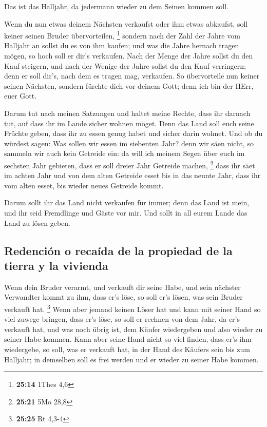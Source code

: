  Das ist das Halljahr, da jedermann wieder zu dem Seinen
kommen soll.

 Wenn du nun etwas deinem Nächsten verkaufst oder ihm
etwas abkaufst, soll keiner seinen Bruder übervorteilen, \footnote{\textbf{25:14}
  1Thes 4,6}  sondern nach der Zahl der Jahre vom
Halljahr an sollst du es von ihm kaufen; und was die Jahre hernach
tragen mögen, so hoch soll er dir's verkaufen.  Nach der
Menge der Jahre sollst du den Kauf steigern, und nach der Wenige der
Jahre sollst du den Kauf verringern; denn er soll dir's, nach dem es
tragen mag, verkaufen.  So übervorteile nun keiner seinen
Nächsten, sondern fürchte dich vor deinem Gott; denn ich bin der HErr,
euer Gott.

 Darum tut nach meinen Satzungen und haltet meine Rechte,
dass ihr darnach tut, auf dass ihr im Lande sicher wohnen möget.
 Denn das Land soll euch seine Früchte geben, dass ihr zu
essen genug habet und sicher darin wohnet.  Und ob du
würdest sagen: Was sollen wir essen im siebenten Jahr? denn wir säen
nicht, so sammeln wir auch kein Getreide ein:  da will
ich meinem Segen über euch im sechsten Jahr gebieten, dass er soll
dreier Jahr Getreide machen, \footnote{\textbf{25:21} 5Mo 28,8}
 dass ihr säet im achten Jahr und von dem alten Getreide
esset bis in das neunte Jahr, dass ihr vom alten esset, bis wieder neues
Getreide kommt.

 Darum sollt ihr das Land nicht verkaufen für immer; denn
das Land ist mein, und ihr seid Fremdlinge und Gäste vor mir.
 Und sollt in all eurem Lande das Land zu lösen geben.

\hypertarget{redenciuxf3n-o-recauxedda-de-la-propiedad-de-la-tierra-y-la-vivienda}{%
\subsection{Redención o recaída de la propiedad de la tierra y la
vivienda}\label{redenciuxf3n-o-recauxedda-de-la-propiedad-de-la-tierra-y-la-vivienda}}

 Wenn dein Bruder verarmt, und verkauft dir seine Habe,
und sein nächster Verwandter kommt zu ihm, dass er's löse, so soll er's
lösen, was sein Bruder verkauft hat. \footnote{\textbf{25:25} Rt 4,3-4}
 Wenn aber jemand keinen Löser hat und kann mit seiner
Hand so viel zuwege bringen, dass er's löse,  so soll er
rechnen von dem Jahr, da er's verkauft hat, und was noch übrig ist, dem
Käufer wiedergeben und also wieder zu seiner Habe kommen.
 Kann aber seine Hand nicht so viel finden, dass er's ihm
wiedergebe, so soll, was er verkauft hat, in der Hand des Käufers sein
bis zum Halljahr; in demselben soll es frei werden und er wieder zu
seiner Habe kommen.


